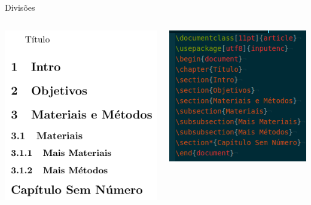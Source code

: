 \documentclass{beamer}
\begin{document}
\begin{frame}{Divisões}
    \begin{columns}[T]
        \begin{column}{.5\textwidth}
            \begin{block}{}
                \includegraphics[width=\columnwidth]{divisoes_output}
            \end{block}
        \end{column}
        \begin{column}{.5\textwidth}
            \begin{block}{}
                \includegraphics[width=\columnwidth]{divisoes_codigo}

\end{block}
\end{column}
\end{columns}
\end{frame}
\end{document}
